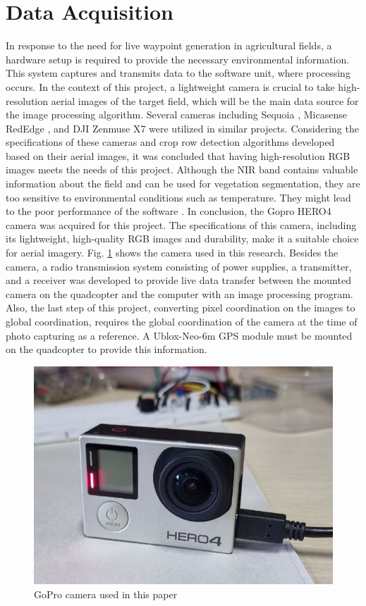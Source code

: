 \documentclass[conference]{IEEEtran}
\begin{document}
\section{Data Acquisition}\label{Data Acquisition}
In response to the need for live waypoint generation in agricultural fields, a hardware setup is required to provide the necessary environmental information. This system captures and transmits data to the software unit, where processing occurs. In the context of this project, a lightweight camera is crucial to take high-resolution aerial images of the target field, which will be the main data source for the image processing algorithm. Several cameras including Sequoia
\cite{b9,b4,b7,b6}
, Micasense RedEdge
\cite{b9,b14}, and DJI Zenmuse X7
\cite{b5} were utilized in similar projects. Considering the specifications of these cameras and crop row detection algorithms developed based on their aerial images, it was concluded that having high-resolution RGB images meets the needs of this project. Although the NIR band contains valuable information about the field and can be used for vegetation segmentation, they are too sensitive to environmental conditions such as temperature. They might lead to the poor performance of the software
\cite{b5}. In conclusion, the Gopro HERO4 camera was acquired for this project. The specifications of this camera, including its lightweight, high-quality RGB images and durability, make it a suitable choice for aerial imagery. Fig.
\ref{gopro} shows the camera used in this research.
Besides the camera, a radio transmission system consisting of power supplies, a transmitter, and a receiver was developed to provide live data transfer between the mounted camera on the quadcopter and the computer with an image processing program.
Also, the last step of this project, converting pixel coordination on the images to global coordination, requires the global coordination of the camera at the time of photo capturing as a reference. A Ublox-Neo-6m GPS module must be mounted on the quadcopter to provide this information.

\begin{figure}[t]
\includegraphics[width=\linewidth]{GoPro.jpg}
\caption{GoPro camera used in this paper}
\label{gopro}
\end{figure}
\end{document}
